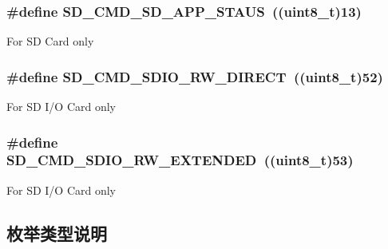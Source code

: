 \subsubsection[{\texorpdfstring{S\+D\+\_\+\+C\+M\+D\+\_\+\+S\+D\+\_\+\+A\+P\+P\+\_\+\+S\+T\+A\+US}{SD_CMD_SD_APP_STAUS}}]{\setlength{\rightskip}{0pt plus 5cm}\#define S\+D\+\_\+\+C\+M\+D\+\_\+\+S\+D\+\_\+\+A\+P\+P\+\_\+\+S\+T\+A\+US~((uint8\+\_\+t)13)}\hypertarget{group__sd__card_ga2984265566ee729869324cf5b842a601}{}\label{group__sd__card_ga2984265566ee729869324cf5b842a601}
For SD Card only 
\subsubsection[{\texorpdfstring{S\+D\+\_\+\+C\+M\+D\+\_\+\+S\+D\+I\+O\+\_\+\+R\+W\+\_\+\+D\+I\+R\+E\+CT}{SD_CMD_SDIO_RW_DIRECT}}]{\setlength{\rightskip}{0pt plus 5cm}\#define S\+D\+\_\+\+C\+M\+D\+\_\+\+S\+D\+I\+O\+\_\+\+R\+W\+\_\+\+D\+I\+R\+E\+CT~((uint8\+\_\+t)52)}\hypertarget{group__sd__card_ga09d3d2d61d003d6bf75c3fb128e86dbb}{}\label{group__sd__card_ga09d3d2d61d003d6bf75c3fb128e86dbb}
For SD I/O Card only 
\subsubsection[{\texorpdfstring{S\+D\+\_\+\+C\+M\+D\+\_\+\+S\+D\+I\+O\+\_\+\+R\+W\+\_\+\+E\+X\+T\+E\+N\+D\+ED}{SD_CMD_SDIO_RW_EXTENDED}}]{\setlength{\rightskip}{0pt plus 5cm}\#define S\+D\+\_\+\+C\+M\+D\+\_\+\+S\+D\+I\+O\+\_\+\+R\+W\+\_\+\+E\+X\+T\+E\+N\+D\+ED~((uint8\+\_\+t)53)}\hypertarget{group__sd__card_gaf40f42039cf756a3805800b48e2790ed}{}\label{group__sd__card_gaf40f42039cf756a3805800b48e2790ed}
For SD I/O Card only 

\subsection{枚举类型说明}
